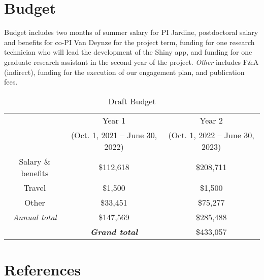 \documentclass[12pt]{elsarticle}
\begin{document}
	\section{Budget}
	Budget includes two months of summer salary for PI Jardine, postdoctoral salary and benefits for co-PI Van Deynze for the project term, funding for one research technician who will lead the development of the Shiny app, and funding for one graduate research assistant in the second year of the project. \textit{Other} includes F\&A (indirect), funding for the execution of our engagement plan, and publication fees.
	
		\begin{table}[h]
				\caption{Draft Budget} 	
			\centering
				\begin{tabular}{ ccc } %
			\hline
			 & Year 1  & Year 2  \\
			 & (Oct. 1, 2021 -- June 30, 2022) & (Oct. 1, 2022 -- June 30, 2023) \\
			 \hline
			\rowcolor[gray]{.9} Salary \& benefits &  \$112,618  & \$208,711 \\ 
			Travel & \$1,500 & \$1,500 \\
			\rowcolor[gray]{.9} Other & \$33,451 & \$75,277 \\
			\hline
			\textit{Annual total} & \$147,569 & \$285,488 \\
			\hline
			& \textbf{\textit{Grand total}} & \$433,057 \\
			\hline
		\end{tabular}
	\end{table}

	
	
	
	\clearpage
	\footnotesize
	\section*{References}
	
\end{document}
